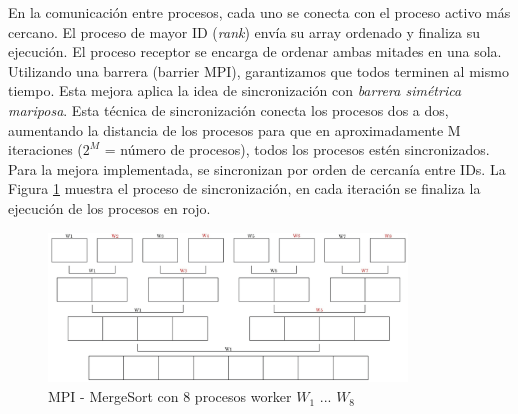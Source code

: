 	En la comunicación entre procesos, cada uno se conecta con el proceso activo más cercano. El proceso de mayor ID (\textit{rank}) envía su array ordenado y finaliza su ejecución. El proceso receptor se encarga de ordenar ambas mitades en una sola. Utilizando una barrera (barrier MPI), garantizamos que todos terminen al mismo tiempo. Esta mejora aplica la idea de sincronización con \textit{barrera simétrica mariposa}. Esta técnica de sincronización conecta los procesos dos a dos, aumentando la distancia de los procesos para que en aproximadamente M iteraciones (\(2^{M}\) = número de procesos), todos los procesos estén sincronizados. Para la mejora implementada, se sincronizan por orden de cercanía entre IDs. La Figura \ref{fig:mergesortmpi} muestra el proceso de sincronización, en cada iteración se finaliza la ejecución de los procesos en rojo.  
	
	\vspace{0.2cm}
	
	\begin{figure}[!h]
		\centering
		\includegraphics[width=0.85\textwidth]{images/chapter_3/mergesort_mpi}
		\caption{MPI - MergeSort con 8 procesos worker \(W_{1}\) ... \(W_{8}\)}
		\label{fig:mergesortmpi}
	\end{figure}



